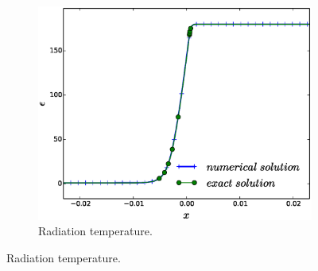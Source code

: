 \documentclass[times,doublespace]{fldauth}%
\begin{document}
\begin{figure}[h]
    ~
    \begin{subfigure}{0.32\textwidth}
    \centering
    \includegraphics[width=\linewidth]{figures/cst-xs/mach-3/mass-diff-radiation-nel-1000-plot.eps}
    \caption{Radiation temperature.}\label{fig:mach-3-cst-xs-rad}
    \end{subfigure}
    

\end{figure}
\end{document}
